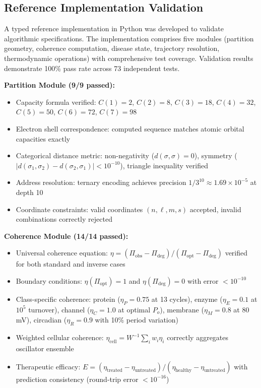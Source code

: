 \documentclass[11pt,twocolumn,a4paper]{article}
\theoremstyle{definition}
\theoremstyle{remark}
\begin{document}
\subsection{Reference Implementation Validation}

A typed reference implementation in Python was developed to validate algorithmic specifications. The implementation comprises five modules (partition geometry, coherence computation, disease state, trajectory resolution, thermodynamic operations) with comprehensive test coverage. Validation results demonstrate 100\% pass rate across 73 independent tests.

\textbf{Partition Module (9/9 passed):}
\begin{itemize}
\item Capacity formula verified: $C(1) = 2$, $C(2) = 8$, $C(3) = 18$, $C(4) = 32$, $C(5) = 50$, $C(6) = 72$, $C(7) = 98$
\item Electron shell correspondence: computed sequence matches atomic orbital capacities exactly
\item Categorical distance metric: non-negativity ($d(\sigma,\sigma) = 0$), symmetry ($|d(\sigma_1,\sigma_2) - d(\sigma_2,\sigma_1)| < 10^{-10}$), triangle inequality verified
\item Address resolution: ternary encoding achieves precision $1/3^{10} \approx 1.69 \times 10^{-5}$ at depth 10
\item Coordinate constraints: valid coordinates $(n,\ell,m,s)$ accepted, invalid combinations correctly rejected
\end{itemize}

\textbf{Coherence Module (14/14 passed):}
\begin{itemize}
\item Universal coherence equation: $\eta = (\Pi_{\mathrm{obs}} - \Pi_{\mathrm{deg}})/(\Pi_{\mathrm{opt}} - \Pi_{\mathrm{deg}})$ verified for both standard and inverse cases
\item Boundary conditions: $\eta({\Pi_{\mathrm{opt}}}) = 1$ and $\eta(\Pi_{\mathrm{deg}}) = 0$ with error $< 10^{-10}$
\item Class-specific coherence: protein ($\eta_P = 0.75$ at 13 cycles), enzyme ($\eta_E = 0.1$ at $10^5$ turnover), channel ($\eta_C = 1.0$ at optimal $P_o$), membrane ($\eta_M = 0.8$ at 80 mV), circadian ($\eta_R = 0.9$ with 10\% period variation)
\item Weighted cellular coherence: $\eta_{\mathrm{cell}} = W^{-1}\sum_i w_i\eta_i$ correctly aggregates oscillator ensemble
\item Therapeutic efficacy: $E = (\eta_{\mathrm{treated}} - \eta_{\mathrm{untreated}})/(\eta_{\mathrm{healthy}} - \eta_{\mathrm{untreated}})$ with prediction consistency (round-trip error $< 10^{-16}$)
\end{itemize}
\end{document}

